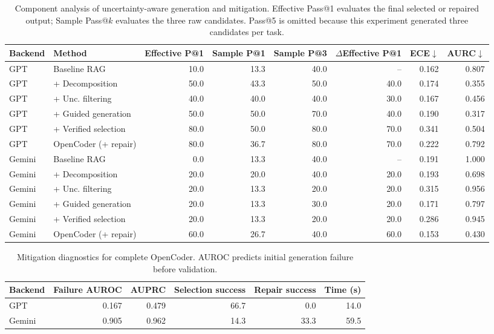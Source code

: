\begin{table}[t]
\centering
\small
\caption{Component analysis of uncertainty-aware generation and mitigation. Effective Pass@1 evaluates the final selected or repaired output; Sample Pass@$k$ evaluates the three raw candidates. Pass@5 is omitted because this experiment generated three candidates per task.}
\label{tab:uncertainty_component_effectiveness}
\begin{tabular}{llrrrrrr}
\toprule
Backend & Method & Effective P@1 & Sample P@1 & Sample P@3 & $\Delta$Effective P@1 & ECE$\downarrow$ & AURC$\downarrow$ \\
\midrule
GPT & Baseline RAG & 10.0 & 13.3 & 40.0 & -- & 0.162 & 0.807 \\
GPT & + Decomposition & 50.0 & 43.3 & 50.0 & 40.0 & 0.174 & 0.355 \\
GPT & + Unc. filtering & 40.0 & 40.0 & 40.0 & 30.0 & 0.167 & 0.456 \\
GPT & + Guided generation & 50.0 & 50.0 & 70.0 & 40.0 & 0.190 & 0.317 \\
GPT & + Verified selection & 80.0 & 50.0 & 80.0 & 70.0 & 0.341 & 0.504 \\
GPT & OpenCoder (+ repair) & 80.0 & 36.7 & 80.0 & 70.0 & 0.222 & 0.792 \\
\midrule
Gemini & Baseline RAG & 0.0 & 13.3 & 40.0 & -- & 0.191 & 1.000 \\
Gemini & + Decomposition & 20.0 & 20.0 & 40.0 & 20.0 & 0.193 & 0.698 \\
Gemini & + Unc. filtering & 20.0 & 13.3 & 20.0 & 20.0 & 0.315 & 0.956 \\
Gemini & + Guided generation & 20.0 & 13.3 & 30.0 & 20.0 & 0.171 & 0.797 \\
Gemini & + Verified selection & 20.0 & 13.3 & 20.0 & 20.0 & 0.286 & 0.945 \\
Gemini & OpenCoder (+ repair) & 60.0 & 26.7 & 40.0 & 60.0 & 0.153 & 0.430 \\
\bottomrule
\end{tabular}
\end{table}

\begin{table}[t]
\centering
\small
\caption{Mitigation diagnostics for complete OpenCoder. AUROC predicts initial generation failure before validation.}
\label{tab:mitigation_diagnostics}
\begin{tabular}{lrrrrr}
\toprule
Backend & Failure AUROC & AUPRC & Selection success & Repair success & Time (s) \\
\midrule
GPT & 0.167 & 0.479 & 66.7 & 0.0 & 14.0 \\
Gemini & 0.905 & 0.962 & 14.3 & 33.3 & 59.5 \\
\bottomrule
\end{tabular}
\end{table}
